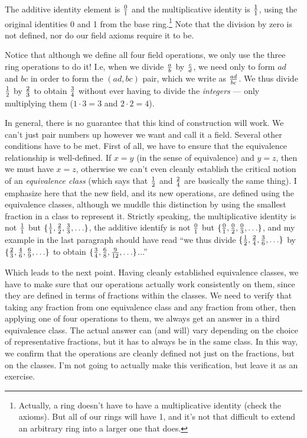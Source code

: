 The additive identity element is $0\over1$ and the multiplicative
identity is $1\over1$, using the original identities 0 and 1 from the
base ring.\footnote{Actually, a ring doesn't have to have a
multiplicative identity (check the axioms).  But all of
our rings will have 1, and it's not that difficult to extend
an arbitrary ring into a larger one that does.}
Note that the division by zero is not defined, nor do
our field axioms require it to be.

Notice that although we define all four field operations, we only
use the three ring operations to do it!  I.e, when we divide
$a\over b$ by $c\over d$, we need only to form $ad$ and $bc$
in order to form the $(ad,bc)$ pair, which we write as ${ad}\over{bc}$.
We thus divide $1\over2$ by $2\over3$ to obtain $3\over4$
without ever having to divide the {\it integers} ---
only multiplying them ($1\cdot3=3$ and $2\cdot2=4$).

In general, there is no guarantee that this kind of construction will
work.  We can't just pair numbers up however we want and call it a
field.  Several other conditions have to be met.  First of all, we
have to ensure that the equivalence relationship is well-defined.  If
$x=y$ (in the sense of equivalence) and $y=z$, then we must have
$x=z$, otherwise we can't even cleanly establish the critical notion
of an {\it equivalence class} (which says that $1\over2$ and $2\over4$
are basically the same thing).  I emphasize here that the new field,
and its new operations, are defined using the equivalence classes,
although we muddle this distinction by using the smallest fraction in
a class to represent it.  Strictly speaking, the multiplicative
identity is not ${1\over1}$ but
$\{{1\over1},{2\over2},{3\over3},\ldots\}$, the additive identify is
not ${0\over1}$ but $\{{0\over1},{0\over2},{0\over3},\ldots\}$, and my
example in the last paragraph should have read ``we thus divide
$\{{1\over2},{2\over4},{3\over6},\ldots\}$ by
$\{{2\over3},{4\over6},{6\over9},\ldots\}$ to obtain
$\{{3\over4},{6\over8},{9\over12},\ldots\}$...''

Which leads to the next point.  Having cleanly established equivalence
classes, we have to make sure that our operations actually work
consistently on them, since they are defined in terms of fractions
within the classes.  We need to verify that taking any fraction from
one equivalence class and any fraction from other, then applying one
of four operations to them, we always get an answer in a third
equivalence class.  The actual answer can (and will) vary depending on
the choice of representative fractions, but it has to always be in the
same class.  In this way, we confirm that the operations are cleanly
defined not just on the fractions, but on the classes.  I'm not going
to actually make this verification, but leave it as an exercise.


